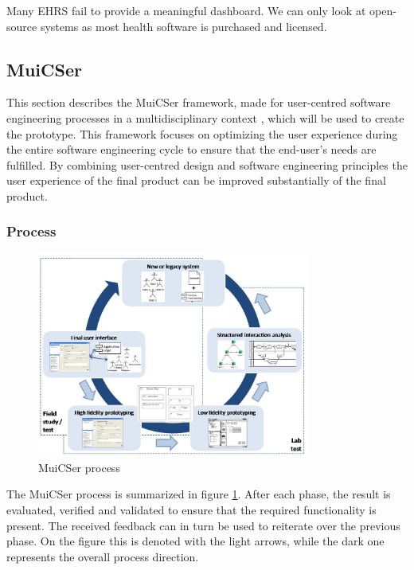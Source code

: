     
    Many EHRS fail to provide a meaningful dashboard. We can only look at open-source systems as most health software is purchased and licensed.


    \subsection{MuiCSer} \label{2_muicser}
    This section describes the MuiCSer framework, made for user-centred software engineering processes in a multidisciplinary context \cite{muicser}, which will be used to create the prototype. This framework focuses on optimizing the user experience during the entire software engineering cycle to ensure that the end-user's needs are fulfilled. By combining user-centred design and software engineering principles the user experience of the final product can be improved substantially of the final product.

        \subsubsection{Process}
        
        \begin{figure}[!t]
            \centering
            \includegraphics[width=0.8\textwidth]{chapters/2_background/muicser}
            \caption{MuiCSer process}\label{fig:muicser}
        \end{figure}

        The MuiCSer process is summarized in figure \ref{fig:muicser}. After each phase, the result is evaluated, verified and validated to ensure that the required functionality is present. The received feedback can in turn be used to reiterate over the previous phase. On the figure this is denoted with the light arrows, while the dark one represents the overall process direction.

